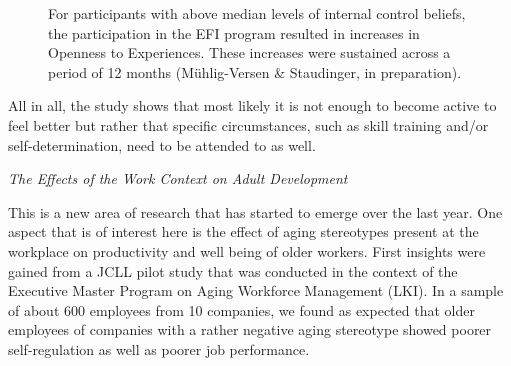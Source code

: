 \begin{figure}[h]
  \begin{center}
    \caption{For participants with above median levels of internal control beliefs, the participation in the EFI program resulted in increases in Openness to Experiences. These increases were sustained across a period of 12 months (M\"uhlig-Versen \& Staudinger, in preparation).}
    \label{fig3:profUrsulaStaudinger}
  \end{center}
\end{figure}

\newpage

 All in all, the study shows that most likely it is not enough to become active to feel better but rather that specific circumstances, such as skill training and/or self-determination, need to be attended to as well.
 
\textit{The Effects of the Work Context on Adult Development}

 This is a new area of research that has started to emerge over the last year. One aspect that is of interest here is the effect of aging stereotypes present at the workplace on productivity and well being of older workers. First insights were gained from a JCLL pilot study that was conducted in the context of the Executive Master Program on Aging Workforce Management (LKI). In a sample of about 600 employees from 10 companies, we found as expected that older employees of companies with a rather negative aging stereotype showed poorer self-regulation as well as poorer job performance.


